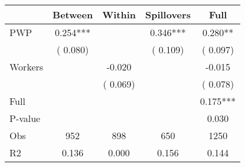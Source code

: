 
\begin{tabular}{l*{4}{c}}\hline&\multicolumn{1}{c}{Between}&\multicolumn{1}{c}{Within}&\multicolumn{1}{c}{Spillovers}&\multicolumn{1}{c}{Full}\\ \hline
 PWP           &              0.254***      &                                               &        0.346*** &         0.280**                            \\ 
                               &        (       0.080)           &                                       &       (       0.109)     &      (       0.097)                                           \\ 
 Workers       &                                               &       -0.020    &                                &            -0.015                            \\ 
                               &                                               & (       0.069)                  &                                        &      (       0.078)                                           \\ 
\hline                                                                                                                                                                                                                                            
 Full                  &                                               &                                               &                                        &             0.175***                                     \\ 
 P-value               &                                               &                                               &                                        &             0.030                                           \\ 
 Obs                   &               952               &       898                       &       650                &              1250                                               \\ 
 R2                    &                      0.136              &              0.000                      &              0.156               &                     0.144                                              \\ 
\hline \end{tabular}                                                                                                                                                                                                              
